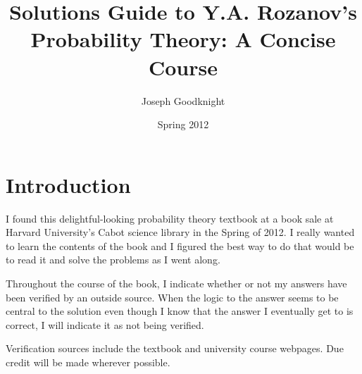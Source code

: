 \documentclass[a4paper,11pt]{book}
\title{Solutions Guide to Y.A. Rozanov's Probability Theory: A Concise Course}
\author{Joseph Goodknight}
\date{Spring 2012}
\begin{document}
\maketitle


\chapter*{Introduction}

I found this delightful-looking probability theory textbook at a book sale at Harvard University's Cabot science library in the Spring of 2012.  I really wanted to learn the contents of the book and I figured the best way to do that would be to read it and solve the problems as I went along.

Throughout the course of the book, I indicate whether or not my answers have been verified by an outside source.  When the logic to the answer seems to be central to the solution even though I know that the answer I eventually get to is correct, I will indicate it as not being verified.  

Verification sources include the textbook and university course webpages.  Due credit will be made wherever possible.
















\end{document}
